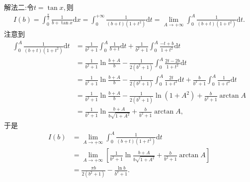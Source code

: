 \documentclass[../../main.tex]{subfiles}%
\begin{document}
\begin{solution}
{\color{blue} 解法二:}令$t=\tan x,$则
\begin{align*}
I\left( b \right) =\int_0^{\frac{\pi}{2}}{\frac{1}{b+\tan x}\mathrm{d}x}=\int_0^{+\infty}{\frac{1}{\left( b+t \right) \left( 1+t^2 \right)}\mathrm{d}t}=\lim\limits_{A\rightarrow +\infty}\int_0^A{\frac{1}{\left( b+t \right) \left( 1+t^2 \right)}\mathrm{d}t}.
\end{align*}
注意到
\begin{align*}
\int_0^A{\frac{1}{\left( b+t \right) \left( 1+t^2 \right)}\mathrm{d}t}&=\frac{1}{b^2+1}\int_0^A{\frac{1}{b+t}\mathrm{d}t}+\frac{1}{b^2+1}\int_0^A{\frac{-t+b}{1+t^2}\mathrm{d}t} \\
&=\frac{1}{b^2+1}\ln \frac{b+A}{b}-\frac{1}{2\left( b^2+1 \right)}\int_0^A{\frac{2t-2b}{1+t^2}\mathrm{d}t} \\
&=\frac{1}{b^2+1}\ln \frac{b+A}{b}-\frac{1}{2\left( b^2+1 \right)}\int_0^A{\frac{2t}{1+t^2}\mathrm{d}t}+\frac{b}{b^2+1}\int_0^A{\frac{1}{1+t^2}\mathrm{d}t} \\
&=\frac{1}{b^2+1}\ln \frac{b+A}{b}-\frac{1}{2\left( b^2+1 \right)}\ln \left( 1+A^2 \right) +\frac{b}{b^2+1}\arctan A \\
&=\frac{1}{b^2+1}\ln \frac{b+A}{b\sqrt{1+A^2}}+\frac{b}{b^2+1}\arctan A,
\end{align*}
于是
\begin{align*}
I\left( b \right) &=\lim\limits_{A\rightarrow +\infty}\int_0^A{\frac{1}{\left( b+t \right) \left( 1+t^2 \right)}\mathrm{d}t} \\
&=\lim\limits_{A\rightarrow +\infty}\left[ \frac{1}{b^2+1}\ln \frac{b+A}{b\sqrt{1+A^2}}+\frac{b}{b^2+1}\arctan A \right] \\
&=\frac{\pi b}{2\left( b^2+1 \right)}-\frac{\ln b}{b^2+1}.
\end{align*}

\end{solution}
\end{document}
